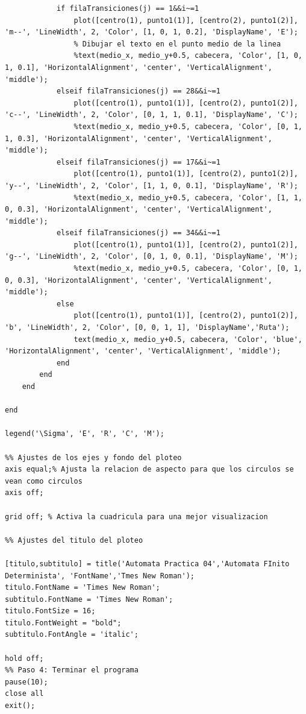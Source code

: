 \documentclass{article}
\begin{document}
\begin{lstlisting}[caption={Archivo: \textit{GraficoAutomataP04} | Script}, style=matlabstyle, basicstyle=\ttfamily\footnotesize]
            % Dibujar la conexion al estadoDestino
            if filaTransiciones(j) == 1&&i~=1
                plot([centro(1), punto1(1)], [centro(2), punto1(2)], 'm--', 'LineWidth', 2, 'Color', [1, 0, 1, 0.2], 'DisplayName', 'E');
                % Dibujar el texto en el punto medio de la linea
                %text(medio_x, medio_y+0.5, cabecera, 'Color', [1, 0, 1, 0.1], 'HorizontalAlignment', 'center', 'VerticalAlignment', 'middle');
            elseif filaTransiciones(j) == 28&&i~=1
                plot([centro(1), punto1(1)], [centro(2), punto1(2)], 'c--', 'LineWidth', 2, 'Color', [0, 1, 1, 0.1], 'DisplayName', 'C');
                %text(medio_x, medio_y+0.5, cabecera, 'Color', [0, 1, 1, 0.3], 'HorizontalAlignment', 'center', 'VerticalAlignment', 'middle');
            elseif filaTransiciones(j) == 17&&i~=1
                plot([centro(1), punto1(1)], [centro(2), punto1(2)], 'y--', 'LineWidth', 2, 'Color', [1, 1, 0, 0.1], 'DisplayName', 'R');
                %text(medio_x, medio_y+0.5, cabecera, 'Color', [1, 1, 0, 0.3], 'HorizontalAlignment', 'center', 'VerticalAlignment', 'middle');
            elseif filaTransiciones(j) == 34&&i~=1
                plot([centro(1), punto1(1)], [centro(2), punto1(2)], 'g--', 'LineWidth', 2, 'Color', [0, 1, 0, 0.1], 'DisplayName', 'M');
                %text(medio_x, medio_y+0.5, cabecera, 'Color', [0, 1, 0, 0.3], 'HorizontalAlignment', 'center', 'VerticalAlignment', 'middle');
            else
                plot([centro(1), punto1(1)], [centro(2), punto1(2)], 'b', 'LineWidth', 2, 'Color', [0, 0, 1, 1], 'DisplayName','Ruta');
                text(medio_x, medio_y+0.5, cabecera, 'Color', 'blue', 'HorizontalAlignment', 'center', 'VerticalAlignment', 'middle');
            end
        end
    end

end

legend('\Sigma', 'E', 'R', 'C', 'M');

%% Ajustes de los ejes y fondo del ploteo
axis equal;% Ajusta la relacion de aspecto para que los circulos se vean como circulos
axis off;

grid off; % Activa la cuadricula para una mejor visualizacion

%% Ajustes del titulo del ploteo

[titulo,subtitulo] = title('Automata Practica 04','Automata FInito Determinista', 'FontName','Tmes New Roman');
titulo.FontName = 'Times New Roman';
subtitulo.FontName = 'Times New Roman';
titulo.FontSize = 16;
titulo.FontWeight = "bold";
subtitulo.FontAngle = 'italic';

hold off;
%% Paso 4: Terminar el programa
pause(10);
close all
exit();

            \end{lstlisting}
\end{document}
